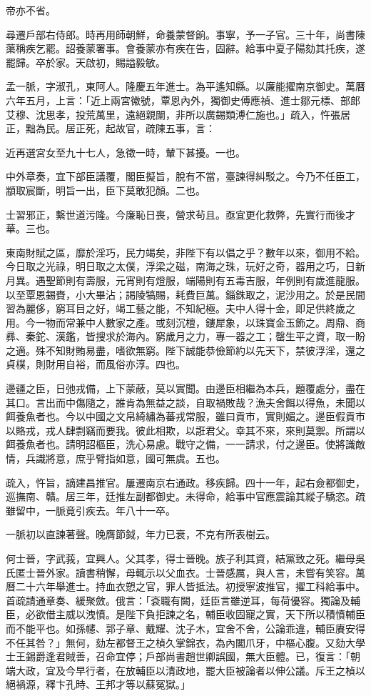 \begin{pinyinscope}
帝亦不省。

尋遷戶部右侍郎。時再用師朝鮮，命養蒙督餉。事寧，予一子官。三十年，尚書陳蕖稱疾乞罷。詔養蒙署事。會養蒙亦有疾在告，固辭。給事中夏子陽劾其托疾，遂罷歸。卒於家。天啟初，賜謚毅敏。

孟一脈，字淑孔，東阿人。隆慶五年進士。為平遙知縣。以廉能擢南京御史。萬曆六年五月，上言：「近上兩宮徽號，覃恩內外，獨御史傅應禎、進士鄒元標、部郎艾穆、沈思孝，投荒萬里，遠絕親闈，非所以廣錫類溥仁施也。」疏入，忤張居正，黜為民。居正死，起故官，疏陳五事，言：

近再選宮女至九十七人，急徵一時，輦下甚擾。一也。

中外章奏，宜下部臣議覆，閣臣擬旨，脫有不當，臺諫得糾駁之。今乃不任臣工，顓取宸斷，明旨一出，臣下莫敢犯顏。二也。

士習邪正，繫世道污隆。今廉恥日喪，營求茍且。亟宜更化救弊，先實行而後才華。三也。

東南財賦之區，靡於淫巧，民力竭矣，非陛下有以倡之乎？數年以來，御用不給。今日取之光祿，明日取之太僕，浮梁之磁，南海之珠，玩好之奇，器用之巧，日新月異。遇聖節則有壽服，元宵則有燈服，端陽則有五毒吉服，年例則有歲進龍服。以至覃恩錫賚，小大畢沾；謁陵犒賜，耗費巨萬。錙銖取之，泥沙用之。於是民間習為麗侈，窮耳目之好，竭工藝之能，不知紀極。夫中人得十金，即足供終歲之用。今一物而常兼中人數家之產。或刻沉檀，鏤犀象，以珠寶金玉飾之。周鼎、商彞、秦鉈、漢鑑，皆搜求於海內。窮歲月之力，專一器之工；罄生平之資，取一盼之適。殊不知財賄易盡，嗜欲無窮。陛下誠能恭儉節約以先天下，禁彼浮淫，還之貞樸，則財用自裕，而風俗亦淳。四也。

邊疆之臣，日弛戎備，上下蒙蔽，莫以實聞。由邊臣相繼為本兵，題覆處分，盡在其口。言出而中傷隨之，誰肯為無益之談，自取禍敗哉？漁夫舍餌以得魚，未聞以餌養魚者也。今以中國之文帛綺繡為蕃戎常服，雖曰貢市，實則媚之。邊臣假貢市以賂戎，戎人肆剽竊而要我。彼此相欺，以誑君父。幸其不來，來則莫禦。所謂以餌養魚者也。請明詔樞臣，洗心易慮。戰守之備，一一請求，付之邊臣。使將識敵情，兵識將意，庶乎臂指如意，國可無虞。五也。

疏入，忤旨，謫建昌推官。屢遷南京右通政。移疾歸。四十一年，起右僉都御史，巡撫南、贛。居三年，廷推左副都御史。未得命，給事中官應震論其縱子驕恣。疏雖留中，一脈竟引疾去。年八十一卒。

一脈初以直諫著聲。晚膺節鉞，年力已衰，不克有所表樹云。

何士晉，字武莪，宜興人。父其孝，得士晉晚。族子利其資，結黨致之死。繼母吳氏匿士晉外家。讀書稍懈，母輒示以父血衣。士晉感厲，與人言，未嘗有笑容。萬曆二十六年舉進士。持血衣愬之官，罪人皆抵法。初授寧波推官，擢工科給事中。首疏請通章奏、緩聚斂。俄言：「袞職有闕，廷臣言雖逆耳，每荷優容。獨論及輔臣，必欲借主威以洩憤。是陛下負拒諫之名，輔臣收固寵之實，天下所以積憤輔臣而不能平也。如孫幰、郭子章、戴耀、沈子木，宜舍不舍，公論乖違，輔臣賡安得不任其咎？」無何，劾左都督王之楨久掌錦衣，為內閣爪牙，中樞心腹。又劾大學士王錫爵逢君賊善，召命宜停；戶部尚書趙世卿誤國，無大臣體。已，復言：「朝端大政，宜及今早行者，在放輔臣以清政地，罷大臣被論者以伸公議。斥王之楨以絕禍源，釋卞孔時、王邦才等以蘇冤獄。」


\end{pinyinscope}
